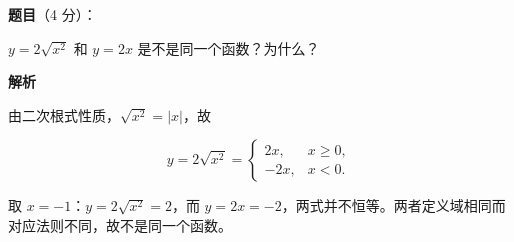 \begin{answer}

\textbf{题目}（4 分）：

$y=2\sqrt{x^2}$ 和 $y=2x$ 是不是同一个函数？为什么？

\textbf{解析}

由二次根式性质，$\sqrt{x^2}=|x|$，故

\nopagebreak[4]
\[
y=2\sqrt{x^2}=\begin{cases}2x, & x\ge0,\\ -2x, & x<0.\end{cases}
\]

取 $x=-1$：$y=2\sqrt{x^2}=2$，而 $y=2x=-2$，两式并不恒等。两者定义域相同而对应法则不同，故不是同一个函数。


\end{answer}
